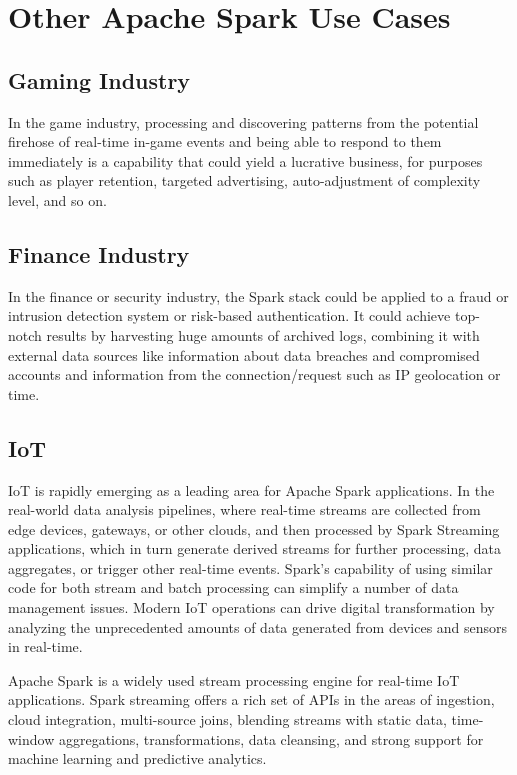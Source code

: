 \documentclass{paper}
\begin{document}
\section{Other Apache Spark Use Cases}

\subsection{Gaming Industry}
In the game industry, processing and discovering patterns from the potential firehose of real-time in-game events and being able to respond to them immediately is a capability that could yield a lucrative business, for purposes such as player retention, targeted advertising, auto-adjustment of complexity level, and so on.\cite{ref:deepcore}\hfill\break

\subsection{Finance Industry}

In the finance or security industry, the Spark stack could be applied to a fraud or intrusion detection system or risk-based authentication. It could achieve top-notch results by harvesting huge amounts of archived logs, combining it with external data sources like information about data breaches and compromised accounts and information from the connection/request such as IP geolocation or time.\cite{ref:deepcore}\hfill\break

\subsection{IoT}
IoT is rapidly emerging as a leading area for Apache Spark applications. In the real-world data analysis pipelines, where real-time streams are collected from edge devices, gateways, or other clouds, and then processed by Spark Streaming applications, which in turn generate derived streams for further processing, data aggregates, or trigger other real-time events. Spark's capability of using similar code for both stream and batch processing can simplify a number of data management issues. Modern IoT operations can drive digital transformation by analyzing the unprecedented amounts of data generated from devices and sensors in real-time.\cite{ref:IoT}\hfill\break

Apache Spark is a widely used stream processing engine for real-time IoT applications. Spark streaming offers a rich set of APIs in the areas of ingestion, cloud integration, multi-source joins, blending streams with static data, time-window aggregations, transformations, data cleansing, and strong support for machine learning and predictive analytics.\cite{ref:deepcore}\hfill\break

\cleardoublepage


\end{document}
